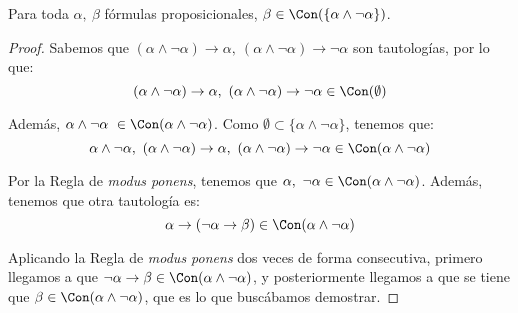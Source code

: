 \begin{prop}
    Para toda $\alpha,~\beta$ fórmulas proposicionales, $\beta\in \Con(\{\alpha\land\lnot\alpha\})$.
    \begin{proof}
        Sabemos que $(\alpha\land \lnot \alpha)\to \alpha,~(\alpha\land \lnot \alpha)\to \lnot \alpha$ son tautologías, por lo que:
        \begin{equation*}
            (\alpha\land \lnot \alpha)\to \alpha,~(\alpha\land \lnot \alpha)\to \lnot \alpha \in \Con(\emptyset)
        \end{equation*}

        Además, $\alpha\land \lnot \alpha~\in \Con(\alpha\land \lnot \alpha)$.
        Como $\emptyset\subset \{\alpha\land \lnot \alpha\}$, tenemos que:
        \begin{equation*}
            \alpha\land \lnot \alpha,~(\alpha\land \lnot \alpha)\to \alpha,~(\alpha\land \lnot \alpha)\to \lnot \alpha \in \Con(\alpha\land \lnot \alpha)
        \end{equation*}

        Por la Regla de \emph{modus ponens}, tenemos que $\alpha,~\lnot \alpha\in \Con(\alpha\land \lnot \alpha)$.
        Además, tenemos que otra tautología es:
        \begin{equation*}
            \alpha\rightarrow(\lnot\alpha\rightarrow\beta)\in \Con(\alpha\land \lnot \alpha)
        \end{equation*}

        Aplicando la Regla de \emph{modus ponens} dos veces de forma consecutiva, primero llegamos a que
        $\lnot\alpha\rightarrow\beta \in \Con(\alpha\land \lnot \alpha)$,
        y posteriormente llegamos a que se tiene que $\beta \in \Con(\alpha\land \lnot \alpha)$,
        que es lo que buscábamos demostrar.

    \end{proof}
\end{prop}



